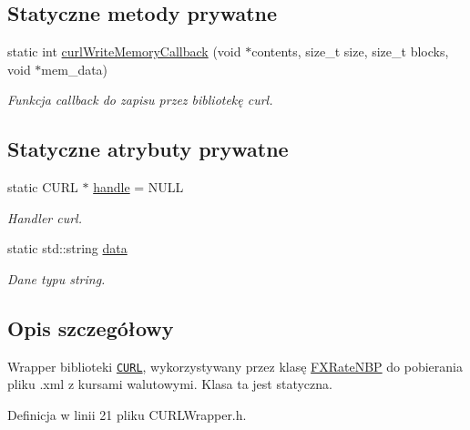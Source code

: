 \subsection*{\-Statyczne metody prywatne}
\begin{DoxyCompactItemize}
\item 
static int \hyperlink{class_c_u_r_l_wrapper_a5618ea572dcba5a643b2f18986ba2619}{curl\-Write\-Memory\-Callback} (void $\ast$contents, size\-\_\-t size, size\-\_\-t blocks, void $\ast$mem\-\_\-data)
\begin{DoxyCompactList}\small\item\em \-Funkcja callback do zapisu przez bibliotekę curl. \end{DoxyCompactList}\end{DoxyCompactItemize}
\subsection*{\-Statyczne atrybuty prywatne}
\begin{DoxyCompactItemize}
\item 
static \-C\-U\-R\-L $\ast$ \hyperlink{class_c_u_r_l_wrapper_a6e4ca915cbdfcca109fec4f46da430a2}{handle} = \-N\-U\-L\-L
\begin{DoxyCompactList}\small\item\em \-Handler curl. \end{DoxyCompactList}\item 
static std\-::string \hyperlink{class_c_u_r_l_wrapper_ac67efd13ddfae37e5d7965c124a88120}{data}
\begin{DoxyCompactList}\small\item\em \-Dane typu string. \end{DoxyCompactList}\end{DoxyCompactItemize}


\subsection{\-Opis szczegółowy}
\-Wrapper biblioteki \href{http://curl.haxx.se/libcurl/}{\tt \-C\-U\-R\-L}, wykorzystywany przez klasę \hyperlink{class_f_x_rate_n_b_p}{\-F\-X\-Rate\-N\-B\-P} do pobierania pliku .xml z kursami walutowymi. \-Klasa ta jest statyczna. 

\-Definicja w linii 21 pliku \-C\-U\-R\-L\-Wrapper.\-h.



